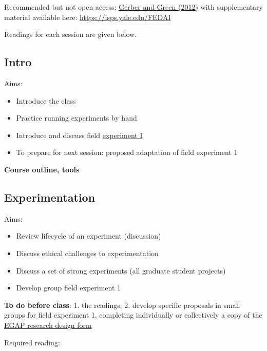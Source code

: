 \documentclass[
  10pt,
  a4paper,10pt]{extarticle}
\providecommand{\tightlist}{%
  \setlength{\itemsep}{0pt}\setlength{\parskip}{0pt}}
\begin{document}
Recommended but not open access:
\href{https://wwnorton.com/books/9780393979954}{Gerber and Green (2012)}
with supplementary material available here:
\url{https://isps.yale.edu/FEDAI}

Readings for each session are given below.

\subsection{Intro}\label{intro}

Aims:

\begin{itemize}
\tightlist
\item
  Introduce the class
\item
  Practice running experiments by hand
\item
  Introduce and discuss field \href{in_class_experiment.html}{experiment
  I}
\item
  To prepare for next session: proposed adaptation of field experiment 1
\end{itemize}

\textbf{Course outline, tools}

\subsection{Experimentation}\label{experimentation}

Aims:

\begin{itemize}
\tightlist
\item
  Review lifecycle of an experiment (discussion)
\item
  Discuss ethical challenges to experimentation
\item
  Discuss a set of strong experiments (all graduate student projects)
\item
  Develop group field experiment 1
\end{itemize}

\textbf{To do before class}: 1. the readings; 2. develop specific
proposals in small groups for field experiment 1, completing
individually or collectively a copy of the
\href{https://egap.github.io/learningdays-resources/Exercises/design-form.html}{EGAP
research design form}

Required reading:
\end{document}
